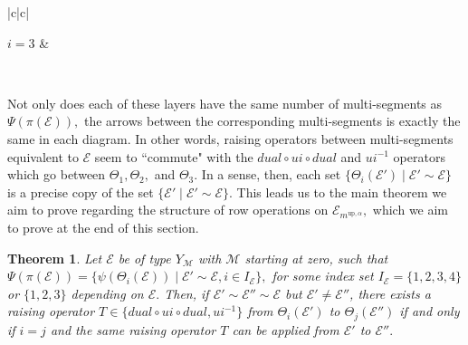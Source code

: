 \documentclass[11pt,letterpaper]{amsart}
\newcommand{\up}{{\mathrm{up}}}
\newcommand{\EE}{\mathcal{E}}
\newtheorem{thm}{Theorem}[section]
\numberwithin{equation}{section}
\begin{document}
\begin{center}
\begin{tabular}{|c|c|}
\\
     \hline
     
     $i = 3$ & 
\\

\hline
\end{tabular}
\end{center}

Not only does each of these layers have the same number of multi-segments as $\Psi(\pi(\mathcal{E})),$ the arrows between the corresponding multi-segments is exactly the same in each diagram. In other words, raising operators between multi-segments equivalent to $\mathcal{E}$ seem to ``commute" with the $dual \circ ui \circ dual$ and $ui^{-1}$ operators which go between $\Theta_1, \Theta_2,$ and $\Theta_3.$ In a sense, then, each set $\{\Theta_i(\mathcal{E}') \mid \mathcal{E}' \sim \mathcal{E}\}$ is a precise copy of the set $\{\mathcal{E}' \mid \mathcal{E}' \sim \mathcal{E}\}.$ This leads us to the main theorem we aim to prove regarding the structure of row operations on $\mathcal{E}_{m^{\up, \alpha}},$ which we aim to prove at the end of this section.

\begin{thm}
\label{commutativity theta correspondence}
    Let $\mathcal{E}$ be of type $Y_\mathcal{M}$ with $\mathcal{M}$ starting at zero, such that $\Psi(\pi(\mathcal{E})) = \{\psi(\Theta_i(\mathcal{E})) \mid \mathcal{E}' \sim \mathcal{E}, i \in I_\mathcal{E}\},$ for some index set $I_\mathcal{E} = \{1, 2, 3, 4\}$ or $\{1, 2, 3\}$ depending on $\mathcal{E}.$ Then, if $\EE' \sim \EE'' \sim \EE$ but $\EE' \neq \EE''$, there exists a raising operator $T \in \{dual \circ ui \circ dual, ui^{-1}\}$ from $\Theta_i(\EE')$ to $\Theta_j(\EE'')$ if and only if $i = j$ and the same raising operator $T$ can be applied from $\EE'$ to $\EE''.$
\end{thm}
\end{document}
